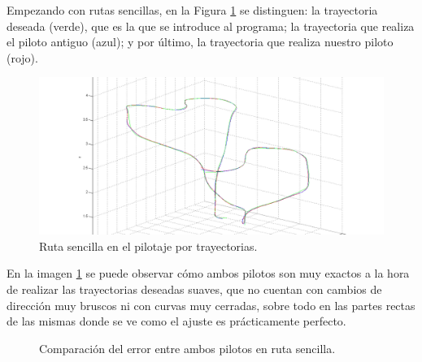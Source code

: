 \hspace{1cm} Empezando con rutas sencillas, en la Figura \ref{fig:Ruta sencilla en trayectoria.} se distinguen: la trayectoria deseada (verde), que es la que se introduce al programa; la trayectoria que realiza el piloto antiguo (azul); y por último, la trayectoria que realiza nuestro piloto (rojo).

\begin{figure}[H]
	\begin{center}
		\includegraphics[width=1.0\textwidth]{imag/IMG40.png}
				\caption{Ruta sencilla en el pilotaje por trayectorias.}
		\label{fig:Ruta sencilla en trayectoria.}	
	\end{center}
\end{figure}

\hspace{1cm} En la imagen \ref{fig:Ruta sencilla en trayectoria.} se puede observar cómo ambos pilotos son muy exactos a la hora de realizar las trayectorias deseadas suaves, que no cuentan con cambios de dirección muy bruscos ni con curvas muy cerradas, sobre todo en las partes rectas de las mismas donde se ve como el ajuste es prácticamente perfecto.

\begin{figure}[H]
 \centering
 \caption{Comparación del error entre ambos pilotos en ruta sencilla.}
 \label{f:Comparativa del error sencilla.}
\end{figure} 
 
